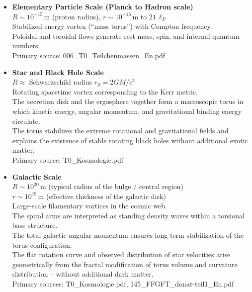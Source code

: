 \begin{itemize}
	\item \textbf{Elementary Particle Scale (Planck to Hadron scale)} \\
	$R \sim 10^{-15}\,\text{m}$ (proton radius), $r \sim 10^{-16}\,\text{m}$ to $21\,\ell_P$ \\
	Stabilized energy vortex (``mass torus'') with Compton frequency. \\
	Poloidal and toroidal flows generate rest mass, spin, and internal quantum numbers. \\
	Primary source: 006\_T0\_Teilchenmassen\_En.pdf
	
	\item \textbf{Star and Black Hole Scale} \\
	$R \approx$ Schwarzschild radius $r_S = 2GM/c^2$ \\
	Rotating spacetime vortex corresponding to the Kerr metric. \\
	The accretion disk and the ergosphere together form a macroscopic torus in which kinetic energy, angular momentum, and gravitational binding energy circulate. \\
	The torus stabilizes the extreme rotational and gravitational fields and explains the existence of stable rotating black holes without additional exotic matter. \\
	Primary source: T0\_Kosmologie.pdf
	
	\item \textbf{Galactic Scale} \\
	$R \sim 10^{20}\,\text{m}$ (typical radius of the bulge / central region) \\
	$r \sim 10^{19}\,\text{m}$ (effective thickness of the galactic disk) \\
	Large-scale filamentary vortices in the cosmic web. \\
	The spiral arms are interpreted as standing density waves within a torsional base structure. \\
	The total galactic angular momentum ensures long-term stabilization of the torus configuration. \\
	The flat rotation curve and observed distribution of star velocities arise geometrically from the fractal modification of torus volume and curvature distribution – without additional dark matter. \\
	Primary sources: T0\_Kosmologie.pdf, 145\_FFGFT\_donat-teil1\_En.pdf
	

\end{itemize}
